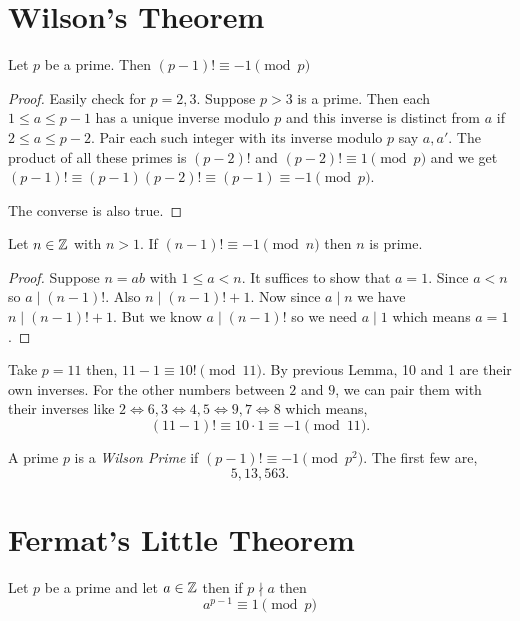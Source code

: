 \section{Wilson's Theorem}
\begin{theorem}
	Let \( p \) be a prime. Then \( (p - 1)! \equiv -1 \pmod p \)
\end{theorem}
\begin{proof}
	Easily check for \( p = 2, 3 \). Suppose \( p > 3 \) is a prime. Then each \( 1 \le a \le p - 1\) has a unique inverse modulo \( p \) and this inverse is distinct from \( a \) if \( 2 \le a \le p - 2 \). Pair each such integer with its inverse   modulo \( p \) say \( a, a' \). The product of all these primes is \( (p - 2)! \) and \( (p - 2)! \equiv 1 \pmod p \) and we get \( (p -1)! \equiv (p-1)(p - 2)! \equiv (p -1) \equiv -1 \pmod p \).

	\vspace{1em}

	The converse is also true. 
\end{proof}
\begin{prop}
	Let \( n \in \mathbb{Z} \) with \( n > 1 \). If \( (n - 1)! \equiv -1 \pmod n \) then \( n  \) is prime.
\end{prop}
\begin{proof}
	Suppose \( n = ab \) with \( 1 \le a < n \). It suffices to show that \( a = 1 \). Since \( a < n \) so \( a \mid (n - 1)! \). Also \( n \mid (n - 1)! + 1  \). Now since \( a \mid n \) we have \( n \mid (n - 1)! + 1 \). But we know \( a \mid (n - 1)! \) so we need \( a \mid 1 \) which means \( a = 1 \).
\end{proof}
\begin{eg}
	Take \( p = 11 \) then, \( 11 - 1 \equiv 10! \pmod {11} \). By previous Lemma, 10 and 1 are their own inverses. For the other numbers between \( 2\) and \( 9 \), we can pair them with their inverses like \( 2\iff 6, 3 \iff 4, 5 \iff 9, 7 \iff 8 \) which means, \[
		(11 - 1)! \equiv 10 \cdot 1 \equiv -1 \pmod {11}
	.\] 
\end{eg}


\begin{definition}
	A prime \( p \) is a \emph{Wilson Prime} if \( (p - 1)! \equiv -1 \pmod {p^2}\). The first few are, \[
		5, 13, 563
	.\] 
\end{definition}
\section{Fermat's Little Theorem}

\begin{theorem}
	Let \( p \) be a prime and let \( a \in \mathbb{Z} \) then if \( p \nmid a \) then \[ a^{p - 1} \equiv 1 \pmod p \]
\end{theorem}
